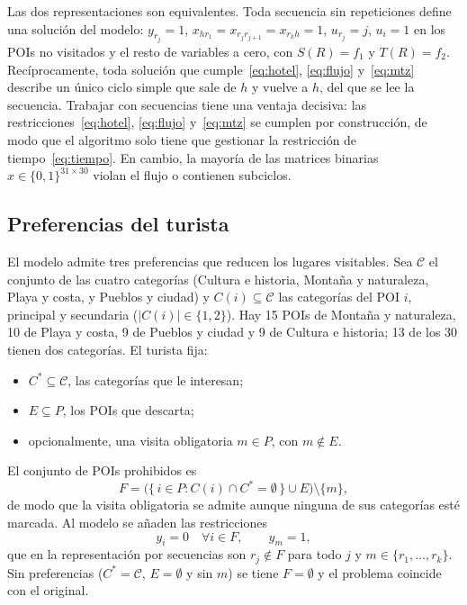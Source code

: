 Las dos representaciones son equivalentes. Toda secuencia sin repeticiones define una solución del modelo: $y_{r_j} = 1$, $x_{h r_1} = x_{r_j r_{j+1}} = x_{r_k h} = 1$, $u_{r_j} = j$, $u_i = 1$ en los POIs no visitados y el resto de variables a cero, con $S(R) = f_1$ y $T(R) = f_2$. Recíprocamente, toda solución que cumple~\eqref{eq:hotel}, \eqref{eq:flujo} y~\eqref{eq:mtz} describe un único ciclo simple que sale de $h$ y vuelve a $h$, del que se lee la secuencia. Trabajar con secuencias tiene una ventaja decisiva: las restricciones~\eqref{eq:hotel}, \eqref{eq:flujo} y~\eqref{eq:mtz} se cumplen por construcción, de modo que el algoritmo solo tiene que gestionar la restricción de tiempo~\eqref{eq:tiempo}. En cambio, la mayoría de las matrices binarias $x \in \{0,1\}^{31\times30}$ violan el flujo o contienen subciclos.

\subsection{Preferencias del turista}
\label{sec:preferencias}

El modelo admite tres preferencias que reducen los lugares visitables. Sea $\mathcal{C}$ el conjunto de las cuatro categorías (Cultura e historia, Montaña y naturaleza, Playa y costa, y Pueblos y ciudad) y $C(i) \subseteq \mathcal{C}$ las categorías del POI $i$, principal y secundaria ($|C(i)| \in \{1,2\}$). Hay 15 POIs de Montaña y naturaleza, 10 de Playa y costa, 9 de Pueblos y ciudad y 9 de Cultura e historia; 13 de los 30 tienen dos categorías. El turista fija:
\begin{itemize}
  \item $C^* \subseteq \mathcal{C}$, las categorías que le interesan;
  \item $E \subseteq P$, los POIs que descarta;
  \item opcionalmente, una visita obligatoria $m \in P$, con $m \notin E$.
\end{itemize}
El conjunto de POIs prohibidos es
\begin{equation}
  F = \bigl(\{\, i \in P : C(i) \cap C^* = \emptyset \,\} \cup E\bigr) \setminus \{m\},
\end{equation}
de modo que la visita obligatoria se admite aunque ninguna de sus categorías esté marcada. Al modelo se añaden las restricciones
\begin{equation}
  y_i = 0 \quad \forall i \in F, \qquad y_m = 1,
  \label{eq:preferencias}
\end{equation}
que en la representación por secuencias son $r_j \notin F$ para todo $j$ y $m \in \{r_1,\dots,r_k\}$. Sin preferencias ($C^* = \mathcal{C}$, $E = \emptyset$ y sin $m$) se tiene $F = \emptyset$ y el problema coincide con el original.

